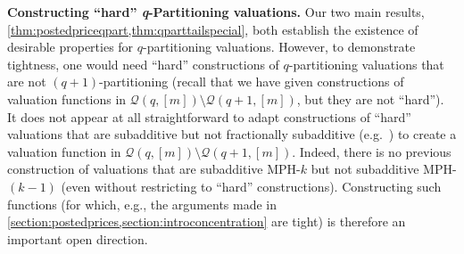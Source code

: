 \documentclass[11pt]{article}%
\newtheorem{definition}[theorem]{Definition}
\newtheorem{problem}[theorem]{Problem}
\numberwithin{theorem}{subsection}
\def\hmath$#1${\texorpdfstring{{\rmfamily\textit{#1}}}{#1}}
\begin{document}
\iffalse 
\begin{problem}
\label{prob:closenessproblem}
What is the optimal value of $\alpha_{m,q,q+1}$ such that $\mathcal{Q}(q,[m])$ is 
$\alpha_{m,q,q+1}$-close to $\mathcal{Q}(q+1, [m])?$ More generally, for $2\le q \le p\le m,$ what is the 
optimal value of $\alpha_{m,q,p}$ such that $\mathcal{Q}(q,[m])$ is 
$\alpha_{m,q,p}$-close to $\mathcal{Q}(p, [m])?$
\end{problem}




\begin{definition}
\label{def:defofapproximation}
Let $\beta\ge 1.$
A class of valuations $\mathcal{F}$ $\beta$-approximates a class of valuations $\mathcal{G}$ over $[m]$ if for any $g\in \mathcal{G},$ there exists some $f\in \mathcal{F}$ such that 
$f(S)\le g(S)\le \beta f(S)$ holds for all $S\subseteq [m].$
\end{definition}



\begin{problem}
\label{prob:approximationproblem}
For $2\le q \le p\le m,$ what is the 
optimal value of $\beta_{m,q,p}$ such that $\mathcal{Q}(q,[m])$ is 
$\beta_{m,q,p}$-approximated by $\mathcal{Q}(p, [m])?$
\end{problem}

We make the trivial observation that if $\mathcal{Q}(p,[m])$ $\beta$-approximates $\mathcal{F},$ then 
$\mathcal{F}$ is $\frac{1}{\beta}$-close to $\mathcal{Q}(p,[m]).$ The converse also holds in the XOS case $q = m$ and is easy to show. 

\fi



\noindent\textbf{Constructing ``hard'' \hmath$q$-Partitioning valuations.}
Our two main results,
\cref{thm:postedpriceqpart,thm:qparttailspecial}, both establish the existence of desirable properties for $q$-partitioning valuations. However, to demonstrate tightness, one would need ``hard'' constructions of $q$-partitioning valuations that are not $(q+1)$-partitioning (recall that we have given constructions of valuation functions in $\mathcal{Q}(q,[m])\setminus \mathcal{Q}(q+1,[m])$, but they are not ``hard''). It does not appear at all straightforward to adapt constructions of ``hard'' valuations that are subadditive but not fractionally subadditive (e.g.~\cite{BhawalkarR11}) to create a valuation function in $\mathcal{Q}(q,[m])\setminus \mathcal{Q}(q+1,[m])$. Indeed, there is no previous construction of valuations that are subadditive MPH-$k$ but not subadditive MPH-$(k-1)$ (even without restricting to ``hard'' constructions). Constructing such functions (for which, e.g., the arguments made in \cref{section:postedprices,section:introconcentration} are tight) is therefore an important open direction.\\
\end{document}
